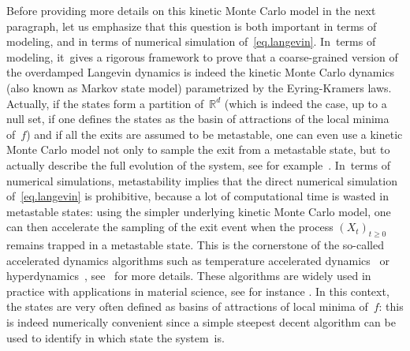 \documentclass[JEP,XML,SOM,Unicode,NoEqCountersInSection,NoFloatCountersInSection,published]{cedram}
\theoremstyle{plain}
\theoremstyle{definition}
\begin{document}
Before providing more details on this kinetic Monte Carlo model in the
next paragraph, let us emphasize that this question is both important in terms
of modeling, and in terms of numerical simulation of~\eqref{eq.langevin}. In~terms of
modeling, it~gives a rigorous framework to prove that a
coarse-grained version of the overdamped Langevin dynamics is indeed
the kinetic Monte Carlo dynamics (also known as Markov state model)
parametrized by the Eyring-Kramers laws. Actually, if the states form a partition of~$\mathbb R^d$ (which is indeed the case, up to a null set, if one defines the states as
the basin of attractions of the local minima of~$f$) and if all the exits are assumed to be metastable, one can even use a kinetic Monte Carlo model not only to
sample the exit from a metastable state, but to actually describe the
full evolution of the system, see for
example~\cite{cameron-14b,schuette-98, schuette-sarich-13,
voter-05,wales-03, pande2010everything}. In~terms of numerical simulations, metastability implies that the direct numerical simulation
of~\eqref{eq.langevin} is prohibitive, because a lot of computational time is wasted
in metastable states: using the simpler underlying kinetic Monte Carlo
model, one can then accelerate the sampling of the exit event when the
process $(X_t)_{t \ge 0}$ remains trapped in a metastable state. This
is the cornerstone of the so-called accelerated dynamics algorithms
such as {temperature accelerated
dynamics}~\cite{sorensen-voter-00} or
{hyperdynamics}~\cite{voter-97,tiwary2013metadynamics},
see~\cite{di-gesu-lelievre-le-peutrec-nectoux-17,lelievre-18,lelievre-perez-24} for more details. These algorithms are widely
used in practice with applications in material science,
see for instance
\cite{bai2010efficient,PhysRevLett87126101,PhysRevB66205415,fan-yip-yildiz-14}. In
this context, the states are very often defined as basins of attractions of local
minima of~$f$: this is indeed numerically convenient since a simple
steepest decent algorithm can be used to identify in which state the
system~is.
\end{document}
